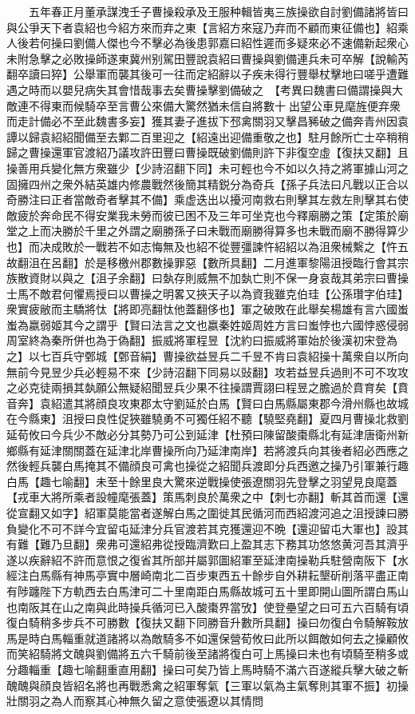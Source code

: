 　　五年春正月董承謀洩壬子曹操殺承及王服种輯皆夷三族操欲自討劉備諸將皆曰與公爭天下者袁紹也今紹方來而弃之東【言紹方來寇乃弃而不顧而東征備也】紹乘人後若何操曰劉備人傑也今不擊必為後患郭嘉曰紹性遲而多疑來必不速備新起衆心未附急擊之必敗操師遂東冀州别駕田豐說袁紹曰曹操與劉備連兵未可卒解【說輸芮翻卒讀曰猝】公舉軍而襲其後可一往而定紹辭以子疾未得行豐舉杖擊地曰嗟乎遭難遇之時而以嬰兒病失其會惜哉事去矣曹操擊劉備破之　【考異曰魏書曰備謂操與大敵連不得東而候騎卒至言曹公來備大驚然猶未信自將數十出望公車見麾旌便弃衆而走計備必不至此魏書多妄】獲其妻子進拔下邳禽關羽又擊昌豨破之備奔青州因袁譚以歸袁紹紹聞備至去鄴二百里迎之【紹遠出迎備重敬之也】駐月餘所亡士卒稍稍歸之曹操還軍官渡紹乃議攻許田豐曰曹操既破劉備則許下非復空虛【復扶又翻】且操善用兵變化無方衆雖少【少詩沼翻下同】未可輕也今不如以久持之將軍據山河之固擁四州之衆外結英雄内修農戰然後簡其精鋭分為奇兵【孫子兵法曰凡戰以正合以奇勝注曰正者當敵奇者擊其不備】乘虚迭出以擾河南救右則擊其左救左則擊其右使敵疲於奔命民不得安業我未勞而彼已困不及三年可坐克也今釋廟勝之策【定策於廟堂之上而决勝於千里之外謂之廟勝孫子曰未戰而廟勝得算多也未戰而廟不勝得算少也】而决成敗於一戰若不如志悔無及也紹不從豐彊諫忤紹紹以為沮衆械繫之【忤五故翻沮在呂翻】於是移檄州郡數操罪惡【數所具翻】二月進軍黎陽沮授臨行會其宗族散資財以與之【沮子余翻】曰埶存則威無不加埶亡則不保一身哀哉其弟宗曰曹操士馬不敵君何懼焉授曰以曹操之明畧又挾天子以為資我雖克伯珪【公孫瓚字伯珪】衆實疲敝而主驕將忲【將即亮翻忲他蓋翻侈也】軍之破敗在此舉矣楊雄有言六國蚩蚩為嬴弱姬其今之謂乎【賢曰法言之文也嬴秦姓姬周姓方言曰蚩悖也六國悖惑侵弱周室終為秦所併也為于偽翻】振威將軍程昱【沈約曰振威將軍始於後漢初宋登為之】以七百兵守鄄城【鄄音絹】曹操欲益昱兵二千昱不肯曰袁紹操十萬衆自以所向無前今見昱少兵必輕易不來【少詩沼翻下同易以䜴翻】攻若益昱兵過則不可不攻攻之必克徒兩損其埶願公無疑紹聞昱兵少果不往操謂賈詡曰程昱之膽過於賁育矣【賁音奔】袁紹遣其將顔良攻東郡太守劉延於白馬【賢曰白馬縣屬東郡今滑州縣也故城在今縣東】沮授曰良性促狹雖驍勇不可獨任紹不聽【驍堅堯翻】夏四月曹操北救劉延荀攸曰今兵少不敵必分其勢乃可公到延津【杜預曰陳留酸棗縣北有延津唐衛州新鄉縣有延津關關蓋在延津北岸曹操所向乃延津南岸】若將渡兵向其後者紹必西應之然後輕兵襲白馬掩其不備顔良可禽也操從之紹聞兵渡即分兵西邀之操乃引軍兼行趣白馬【趣七喻翻】未至十餘里良大驚來逆戰操使張遼關羽先登擊之羽望見良麾蓋【戎車大將所乘者設幢麾張蓋】策馬刺良於萬衆之中【刺七亦翻】斬其首而還【還從宣翻又如字】紹軍莫能當者遂解白馬之圍徙其民循河而西紹渡河追之沮授諫曰勝負變化不可不詳今宜留屯延津分兵官渡若其克獲還迎不晩【還迎留屯大軍也】設其有難【難乃旦翻】衆弗可還紹弗從授臨濟歎曰上盈其志下務其功悠悠黄河吾其濟乎遂以疾辭紹不許而意恨之復省其所部并屬郭圖紹軍至延津南操勒兵駐營南阪下【水經注白馬縣有神馬亭實中層崎南北二百步東西五十餘步自外耕耘墾斫削落平盡正南有陟躔陛下方軌西去白馬津可二十里南距白馬縣故城可五十里即開山圖所謂白馬山也南阪其在山之南與此時操兵循河已入酸棗界當攷】使登壘望之曰可五六百騎有頃復白騎稍多步兵不可勝數【復扶又翻下同勝音升數所具翻】操曰勿復白令騎解鞍放馬是時白馬輜重就道諸將以為敵騎多不如還保營荀攸曰此所以餌敵如何去之操顧攸而笑紹騎將文醜與劉備將五六千騎前後至諸將復白可上馬操曰未也有頃騎至稍多或分趣輜重【趣七喻翻重直用翻】操曰可矣乃皆上馬時騎不滿六百遂縱兵擊大破之斬醜醜與顔良皆紹名將也再戰悉禽之紹軍奪氣【三軍以氣為主氣奪則其軍不振】初操壯關羽之為人而察其心神無久留之意使張遼以其情問